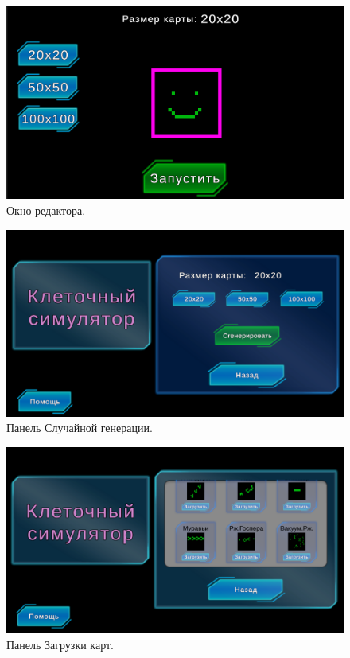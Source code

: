 \documentclass[14pt, oneside]{altsu-report}
\begin{document}
\begin{figure}[H]
	\centering
	\includegraphics[width=1\textwidth]{images/Editor.png}  
	\caption{Окно редактора.}
	\label{Editor}
\end{figure}

\begin{figure}[H]
	\centering
	\includegraphics[width=1\textwidth]{images/rand1.png}  
	\caption{Панель Случайной генерации.}
	\label{rand}
\end{figure}

\begin{figure}[H]
	\centering
	\includegraphics[width=1\textwidth]{images/downld.png}  
	\caption{Панель Загрузки карт.}
	\label{downl}
\end{figure}
\end{document}
